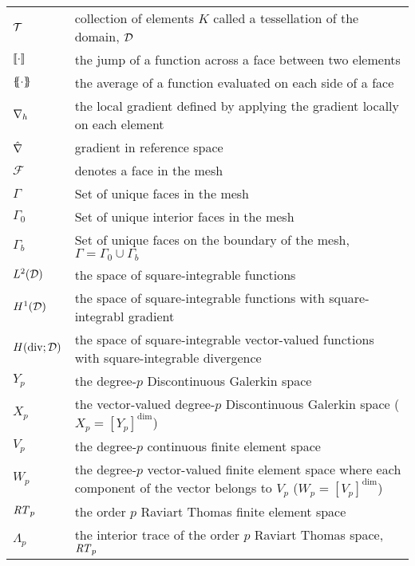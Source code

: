 \documentclass[../doc.tex]{subfiles}
\begin{document}
\begin{longtable}{p{2cm}p{12cm}}
$\mathcal{T}$ & collection of elements $K$ called a tessellation of the domain, $\mathcal{D}$ \\
$\left\llbracket\cdot \right\rrbracket$ & the jump of a function across a face between two elements \\
$\left\{\!\!\left\{\cdot\right\}\!\!\right\}$ & the average of a function evaluated on each side of a face \\
$\nabla_h$ & the local gradient defined by applying the gradient locally on each element \\ 
$\hat{\nabla}$ & gradient in reference space \\
$\mathcal{F}$ & denotes a face in the mesh \\
$\Gamma$ & Set of unique faces in the mesh \\
$\Gamma_0$ & Set of unique interior faces in the mesh \\
$\Gamma_b$ & Set of unique faces on the boundary of the mesh, $\Gamma = \Gamma_0 \cup \Gamma_b$ \\
$L^2(\mathcal{D})$ & the space of square-integrable functions \\ 
$H^1(\mathcal{D})$ & the space of square-integrable functions with square-integrabl gradient \\ 
$H(\operatorname{div};\mathcal{D})$ & the space of square-integrable vector-valued functions with square-integrable divergence \\ 
$Y_p$ & the degree-$p$ Discontinuous Galerkin space \\
$X_p$ & the vector-valued degree-$p$ Discontinuous Galerkin space ($X_p = [Y_p]^{\dim}$)\\
$V_p$ & the degree-$p$ continuous finite element space \\ 
$W_p$ & the degree-$p$ vector-valued finite element space where each component of the vector belongs to $V_p$ ($W_p = [V_p]^{\dim}$) \\ 
$\mathit{RT}_p$ & the order $p$ Raviart Thomas finite element space \\ 
$\Lambda_p$ & the interior trace of the order $p$ Raviart Thomas space, $\mathit{RT}_p$ \\
\end{longtable}
\end{document}
